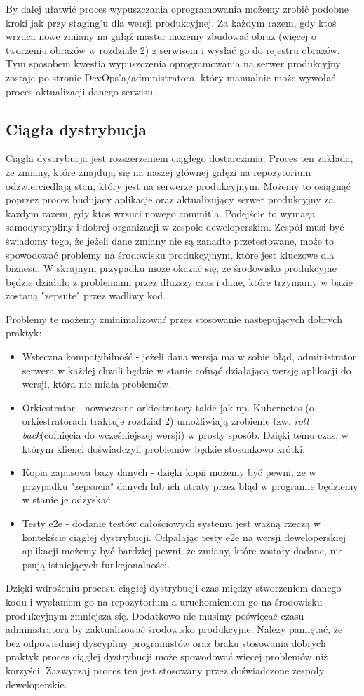 \par
By dalej ułatwić proces wypuszczania oprogramowania możemy zrobić podobne kroki jak przy staging'u dla wersji produkcyjnej. Za każdym razem, gdy ktoś wrzuca nowe zmiany na gałąź master możemy zbudować obraz (więcej o tworzeniu obrazów w rozdziale 2) z serwisem i wysłać go do rejestru obrazów. Tym sposobem kwestia wypuszczenia oprogramowania na serwer produkcyjny zostaje po stronie DevOps'a/administratora, który manualnie może wywołać proces aktualizacji danego serwisu. 
\subsection{Ciągła dystrybucja}
Ciągła dystrybucja jest rozszerzeniem ciągłego dostarczania. Proces ten zakłada, że zmiany, które znajdują się na naszej głównej gałęzi na repozytorium odzwierciedlają stan, który jest na serwerze produkcyjnym. Możemy to osiągnąć poprzez proces budujący aplikacje oraz aktualizujący serwer produkcyjny za każdym razem, gdy ktoś wrzuci nowego commit'a. Podejście to wymaga samodyscypliny i dobrej organizacji w zespole deweloperskim. Zespół musi być świadomy tego, że jeżeli dane zmiany nie są zanadto przetestowane, może to spowodować problemy na środowisku produkcyjnym, które jest kluczowe dla biznesu. W skrajnym przypadku może okazać się, że środowisko produkcyjne będzie działało z problemami przez dłuższy czas i dane, które trzymamy w bazie zostaną "zepsute" przez wadliwy kod.
\par
Problemy te możemy zminimalizować przez stosowanie następujących dobrych praktyk:
\begin{itemize}
    \item Wsteczna kompatybilność - jeżeli dana wersja ma w sobie błąd, administrator serwera w każdej chwili będzie w stanie cofnąć działającą wersję aplikacji do wersji, która nie miała problemów,
    \item Orkiestrator - nowoczesne orkiestratory takie jak np. Kubernetes (o orkiestratorach traktuje rozdział 2) umożliwiają zrobienie tzw. \textit{roll back}(cofnięcia do wcześniejszej wersji) w prosty sposób. Dzięki temu czas, w którym klienci doświadczyli problemów będzie stosunkowo krótki,
    \item Kopia zapasowa bazy danych - dzięki kopii możemy być pewni, że w przypadku "zepsucia" danych lub ich utraty przez błąd w programie będziemy w stanie je odzyskać,
    \item Testy e2e - dodanie testów całościowych systemu jest ważną rzeczą w kontekście ciągłej dystrybucji. Odpalając testy e2e na wersji deweloperskiej aplikacji możemy być bardziej pewni, że zmiany, które zostały dodane, nie psują istniejących funkcjonalności.
\end{itemize}
Dzięki wdrożeniu procesu ciągłej dystrybucji czas między stworzeniem danego kodu i wysłaniem go na repozytorium a uruchomieniem go na środowisku produkcyjnym zmniejsza się. Dodatkowo nie musimy poświęcać czasu administratora by zaktualizować środowisko produkcyjne. Należy pamiętać, że bez odpowiedniej dyscypliny programistów oraz braku stosowania dobrych praktyk proces ciągłej dystrybucji może spowodować więcej problemów niż korzyści. Zazwyczaj proces ten jest stosowany przez doświadczone zespoły deweloperskie.

